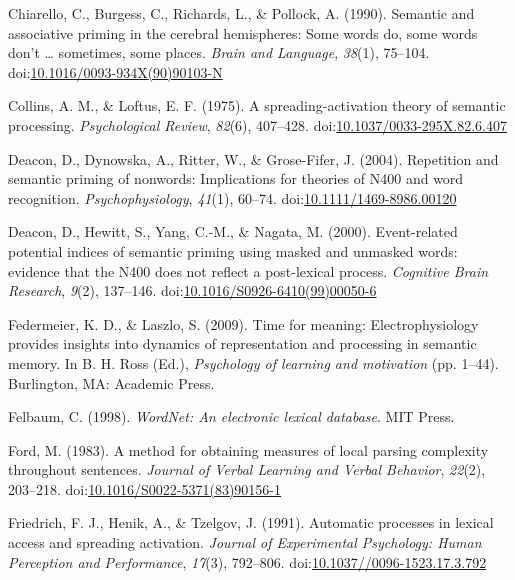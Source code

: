 \documentclass[english,man]{apa6}
\theoremstyle{definition}
\theoremstyle{definition}
\theoremstyle{definition}
\theoremstyle{remark}
\begin{document}
\hypertarget{ref-Chiarello1990}{}
Chiarello, C., Burgess, C., Richards, L., \& Pollock, A. (1990).
Semantic and associative priming in the cerebral hemispheres: Some words
do, some words don't \ldots{} sometimes, some places. \emph{Brain and
Language}, \emph{38}(1), 75--104.
doi:\href{https://doi.org/10.1016/0093-934X(90)90103-N}{10.1016/0093-934X(90)90103-N}

\hypertarget{ref-Collins1975}{}
Collins, A. M., \& Loftus, E. F. (1975). A spreading-activation theory
of semantic processing. \emph{Psychological Review}, \emph{82}(6),
407--428.
doi:\href{https://doi.org/10.1037/0033-295X.82.6.407}{10.1037/0033-295X.82.6.407}

\hypertarget{ref-Deacon2004}{}
Deacon, D., Dynowska, A., Ritter, W., \& Grose-Fifer, J. (2004).
Repetition and semantic priming of nonwords: Implications for theories
of N400 and word recognition. \emph{Psychophysiology}, \emph{41}(1),
60--74.
doi:\href{https://doi.org/10.1111/1469-8986.00120}{10.1111/1469-8986.00120}

\hypertarget{ref-Deacon2000}{}
Deacon, D., Hewitt, S., Yang, C.-M., \& Nagata, M. (2000). Event-related
potential indices of semantic priming using masked and unmasked words:
evidence that the N400 does not reflect a post-lexical process.
\emph{Cognitive Brain Research}, \emph{9}(2), 137--146.
doi:\href{https://doi.org/10.1016/S0926-6410(99)00050-6}{10.1016/S0926-6410(99)00050-6}

\hypertarget{ref-Federmeier2009}{}
Federmeier, K. D., \& Laszlo, S. (2009). Time for meaning:
Electrophysiology provides insights into dynamics of representation and
processing in semantic memory. In B. H. Ross (Ed.), \emph{Psychology of
learning and motivation} (pp. 1--44). Burlington, MA: Academic Press.

\hypertarget{ref-Felbaum1998}{}
Felbaum, C. (1998). \emph{WordNet: An electronic lexical database}. MIT
Press.

\hypertarget{ref-Ford1983}{}
Ford, M. (1983). A method for obtaining measures of local parsing
complexity throughout sentences. \emph{Journal of Verbal Learning and
Verbal Behavior}, \emph{22}(2), 203--218.
doi:\href{https://doi.org/10.1016/S0022-5371(83)90156-1}{10.1016/S0022-5371(83)90156-1}

\hypertarget{ref-Friedrich1991}{}
Friedrich, F. J., Henik, A., \& Tzelgov, J. (1991). Automatic processes
in lexical access and spreading activation. \emph{Journal of
Experimental Psychology: Human Perception and Performance},
\emph{17}(3), 792--806.
doi:\href{https://doi.org/10.1037//0096-1523.17.3.792}{10.1037//0096-1523.17.3.792}
\end{document}
